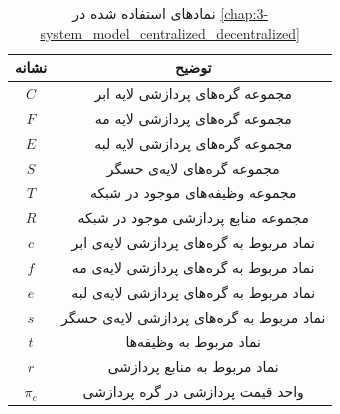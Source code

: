 	\begin{table}[h!]
		\caption{نماد‌های استفاده شده در \cref{chap:3-system_model_centralized_decentralized}}
		\begin{tabularx}{\textwidth}{|c|C|} \hline
			نشانه                & توضیح                                                                                     \\ \hline
			$C$                 & مجموعه‌ گره‌های پردازشی لایه ابر    \\ \hline                                                                   
			$F$                 & مجموعه‌ گره‌های پردازشی لایه مه     \\ \hline                                                                  
			$E$                 & مجموعه‌ گره‌های پردازشی لایه لبه    \\ \hline                                                                   
			$S$                 & مجموعه‌ گره‌های لایه‌ی حسگر            \\ \hline                                                                                
			$T$                 & مجموعه‌ وظیفه‌های موجود در شبکه      \\ \hline                                                            
			$R$                 & مجموعه‌ منابع پردازشی موجود در شبکه      \\ \hline                                                            
			$c$                 & نماد مربوط به گره‌های پردازشی لایه‌ی ابر   \\ \hline                                                                    
			$f$                 & نماد مربوط به گره‌های پردازشی لایه‌ی مه    \\ \hline                                                                   
			$e$                 & نماد مربوط به گره‌های پردازشی لایه‌ی لبه   \\ \hline                                                                    
			$s$                 & نماد مربوط به گره‌های پردازشی لایه‌ی حسگر   \\ \hline                                                                                         
			$t$                 & نماد مربوط به وظیفه‌ها       \\ \hline                                                           
			$r$                 & نماد مربوط به منابع پردازشی   \\ \hline                                                                                         
			$\pi_c$        	 	& واحد قیمت پردازشی در گره پردازشی  \\ \hline                                                        

\end{tabularx}
\end{table}
